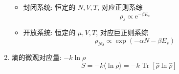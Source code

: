 \documentclass[12pt,a4paper]{article}%
\numberwithin{equation}{section}
\newcommand\e{\mathrm{e}}%
\begin{document}
\begin{enumerate}
\begin{itemize}
        \item 封闭系统: 恒定的 $N, V, T$, 对应正则系综
        \begin{equation}
            \rho_s\propto\e^{-\beta E_s}
        \end{equation}
        \item 开放系统: 恒定的 $\mu, V, T$, 对应巨正则系综
        \begin{equation}
            \rho_{Ns}\propto\exp\left(-\alpha N -\beta E_s\right)
        \end{equation}
    \end{itemize}
    \item 熵的微观对应量: $-k\ln\rho$
    \begin{equation}
        S = -k\langle\ln\rho\rangle = -k\operatorname{Tr}[\hat\rho\ln\hat\rho]
    \end{equation}
\end{enumerate}
\end{document}
